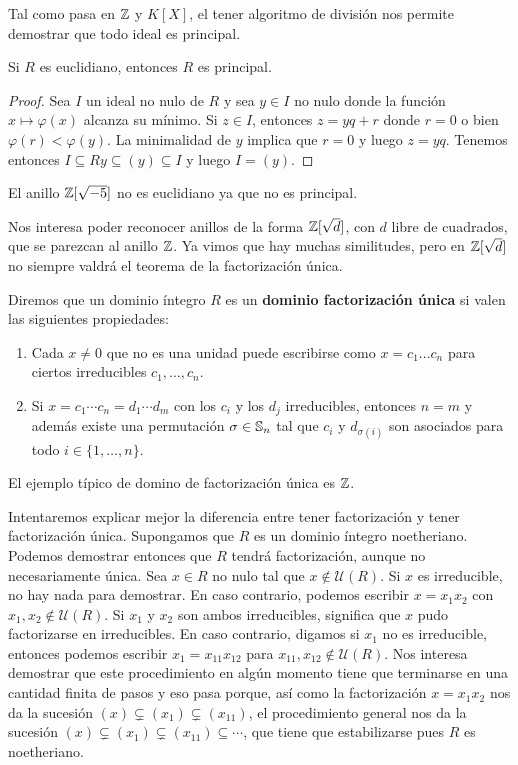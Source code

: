 Tal como pasa en $\mathbb{Z}$ y $K[X]$, el tener algoritmo de división nos permite demostrar que todo ideal es principal.

\begin{theorem}
	Si $R$ es euclidiano, entonces $R$ es principal. 
\end{theorem}

\begin{proof}
	Sea $I$ un ideal no nulo de $R$ y sea $y\in I$ no nulo donde la función $x\mapsto\varphi(x)$ alcanza su mínimo. 
	Si $z\in I$, entonces $z=yq+r$ donde $r=0$ o bien $\varphi(r)<\varphi(y)$. La minimalidad de $y$ implica que $r=0$ y 
	luego $z=yq$. Tenemos entonces $I\subseteq Ry\subseteq (y)\subseteq I$ y luego $I=(y)$.     
\end{proof}

\begin{example}
El anillo $\mathbb{Z}[\sqrt{-5}]$ no es euclidiano ya que no es principal. 
\end{example}

Nos interesa poder reconocer anillos de la forma $\mathbb{Z}[\sqrt{d}]$, con $d$ libre de cuadrados, que se parezcan al anillo $\mathbb{Z}$. Ya vimos
que hay muchas similitudes, pero en $\mathbb{Z}[\sqrt{d}]$ no siempre valdrá el teorema de la factorización única.

\begin{definition}
Diremos que un dominio íntegro $R$ es un \textbf{dominio factorización única} si valen las siguientes propiedades:
\begin{enumerate}
\item Cada $x\ne0$ que no es una unidad puede escribirse 
como $x=c_1\dots c_n$ para ciertos irreducibles $c_1,\dots,c_n$.  
\item Si $x=c_1\cdots c_n=d_1\cdots d_m$ con los $c_i$ y los $d_j$ irreducibles, entonces $n=m$ y además existe 
una permutación $\sigma\in\mathbb{S}_n$ tal que $c_i$ y $d_{\sigma(i)}$ son asociados para todo $i\in\{1,\dots,n\}$. 	
\end{enumerate}
\end{definition}

El ejemplo típico de domino de factorización única es $\mathbb{Z}$. 

Intentaremos explicar mejor la diferencia entre tener factorización y tener factorización única. Supongamos que $R$ es un dominio íntegro noetheriano. Podemos demostrar entonces que $R$ tendrá factorización, aunque no necesariamente única. Sea $x\in R$ no nulo tal que
$x\not\in\mathcal{U}(R)$. Si $x$ es irreducible, no hay nada para demostrar. En caso contrario, podemos
escribir 
$x=x_1x_2$ con $x_1,x_2\not\in\mathcal{U}(R)$. Si $x_1$ y $x_2$ son ambos irreducibles, 
significa que $x$ pudo factorizarse en irreducibles. En caso
contrario, digamos si $x_1$ no es irreducible, entonces
podemos escribir $x_1=x_{11}x_{12}$ para $x_{11},x_{12}\not\in\mathcal{U}(R)$. Nos interesa demostrar 
que este procedimiento en algún momento tiene que terminarse en una cantidad finita de pasos y eso
pasa porque, así como la factorización $x=x_1x_2$ nos da la sucesión 
$(x)\subsetneq (x_1)\subsetneq (x_{11})$, el procedimiento general
nos da la sucesión
$(x)\subsetneq (x_1)\subsetneq (x_{11})\subseteq\cdots$, 
que tiene que estabilizarse pues $R$ es noetheriano. 

